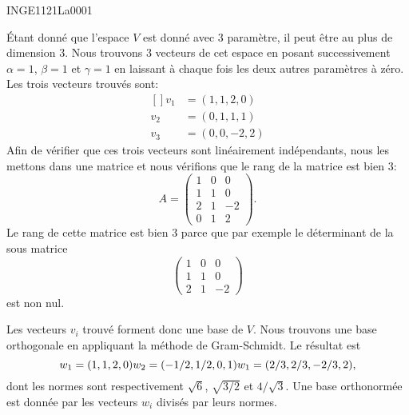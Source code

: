 

\begin{corrige}{INGE1121La0001}

	Étant donné que l'espace $V$ est donné avec $3$ paramètre, il peut être au plus de dimension $3$. Nous trouvons $3$ vecteurs de cet espace en posant successivement $\alpha=1$, $\beta=1$ et $\gamma=1$ en laissant à chaque fois les deux autres paramètres à zéro. Les trois vecteurs trouvés sont:
	\begin{equation}
		\begin{aligned}[]
			v_1&=(1,1,2,0)\\
			v_2&=(0,1,1,1)\\
			v_3&=(0,0,-2,2)
		\end{aligned}
	\end{equation}
	Afin de vérifier que ces trois vecteurs sont linéairement indépendants, nous les mettons dans une matrice et nous vérifions que le rang de la matrice est bien $3$:
	\begin{equation}
		A=\begin{pmatrix}
			1	&	0	&	0	\\
			1	&	1	&	0	\\
			2	&	1	&	-2	\\
			0	&	1	&	2
		\end{pmatrix}.
	\end{equation}
	Le rang de cette matrice est bien $3$ parce que par exemple le déterminant de la sous matrice
	\begin{equation}
		\begin{pmatrix}
			1	&	0	&	0	\\
			1	&	1	&	0	\\
			2	&	1	&	-2
		\end{pmatrix}
	\end{equation}
	est non nul.

	Les vecteurs $v_i$ trouvé forment donc une base de $V$. Nous trouvons une base orthogonale en appliquant la méthode de Gram-Schmidt. Le résultat est
	\begin{equation}
		w_1=(1,1,2,0)\\
		w_2=(-1/2,1/2,0,1)\\
		w_1=(2/3,2/3,-2/3,2),
	\end{equation}
	dont les normes sont respectivement $\sqrt{6}$, $\sqrt{3/2}$ et $4/\sqrt{3}$. Une base orthonormée est donnée par les vecteurs $w_i$ divisés par leurs normes.

\end{corrige}
